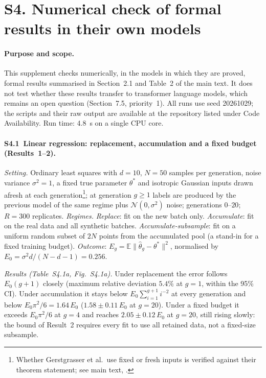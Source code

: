 
\section*{S4. Numerical check of formal results in their own models}

\paragraph{Purpose and scope.}
This supplement checks numerically, in the models in which they are proved, formal
results summarised in Section~2.1 and Table~2 of the main text. It does not test
whether these results transfer to transformer language models, which remains an open
question (Section~7.5, priority~1). All runs use seed 20261029; the scripts and
their raw output are available at the repository listed under Code Availability.
Run time: 4.8~s on a single CPU core.

\paragraph{S4.1~Linear regression: replacement, accumulation and a fixed budget
(Results~1--2).}
\emph{Setting.} Ordinary least squares with $d=10$, $N=50$ samples per
generation, noise variance $\sigma^2=1$, a fixed true parameter $\theta^\ast$ and
isotropic Gaussian inputs drawn afresh at each generation\footnote{Whether
Gerstgrasser et al.\ use fixed or fresh inputs is verified against their theorem
statement; see main text, .}; at generation $g\ge1$ labels are produced
by the previous model of the same regime plus $\mathcal N(0,\sigma^2)$ noise;
generations $0$--$20$; $R=300$ replicates.
\emph{Regimes.} \textit{Replace}: fit on the new batch only.
\textit{Accumulate}: fit on the real data and all synthetic batches.
\textit{Accumulate-subsample}: fit on a uniform random subset of $2N$ points from
the accumulated pool (a stand-in for a fixed training budget).
\emph{Outcome}: $E_g = \mathbb{E}\lVert\hat\theta_g-\theta^\ast\rVert^2$,
normalised by $E_0 = \sigma^2 d/(N{-}d{-}1) = 0.256$.

\emph{Results (Table~S4.1a, Fig.~S4.1a).}
Under replacement the error follows $E_0(g+1)$ closely (maximum relative
deviation $5.4\%$ at $g=1$, within the 95\% CI).
Under accumulation it stays below $E_0\sum_{i=1}^{g+1}i^{-2}$ at every generation
and below $E_0\pi^2/6 = 1.64\,E_0$ ($1.58\pm0.11\,E_0$ at $g=20$).
Under a fixed budget it exceeds $E_0\pi^2/6$ at $g=4$ and reaches
$2.05\pm0.12\,E_0$ at $g=20$, still rising slowly: the bound of Result~2 requires
every fit to use all retained data, not a fixed-size subsample.

